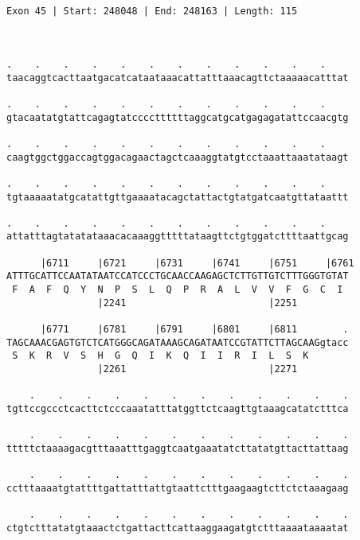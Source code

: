 \documentclass{article}
\begin{document}
\begin{Verbatim}
  
 
Exon 45 | Start: 248048 | End: 248163 | Length: 115



.    .    .    .    .    .    .    .    .    .    .    .    
taacaggtcacttaatgacatcataataaacattatttaaacagttctaaaaacatttat
                                                            
.    .    .    .    .    .    .    .    .    .    .    .    
gtacaatatgtattcagagtatccccttttttaggcatgcatgagagatattccaacgtg
                                                            
.    .    .    .    .    .    .    .    .    .    .    .    
caagtggctggaccagtggacagaactagctcaaaggtatgtcctaaattaaatataagt
                                                            
.    .    .    .    .    .    .    .    .    .    .    .    
tgtaaaaatatgcatattgttgaaaatacagctattactgtatgatcaatgttataattt
                                                            
.    .    .    .    .    .    .    .    .    .    .    .    
attatttagtatatataaacacaaaggtttttataagttctgtggatcttttaattgcag
                                                            
      |6711     |6721     |6731     |6741     |6751     |6761
ATTTGCATTCCAATATAATCCATCCCTGCAACCAAGAGCTCTTGTTGTCTTTGGGTGTAT
 F  A  F  Q  Y  N  P  S  L  Q  P  R  A  L  V  V  F  G  C  I 
                |2241                         |2251         
  
      |6771     |6781     |6791     |6801     |6811        .
TAGCAAACGAGTGTCTCATGGGCAGATAAAGCAGATAATCCGTATTCTTAGCAAGgtacc
 S  K  R  V  S  H  G  Q  I  K  Q  I  I  R  I  L  S  K       
                |2261                         |2271         
  
    .    .    .    .    .    .    .    .    .    .    .    .
tgttccgccctcacttctcccaaatatttatggttctcaagttgtaaagcatatctttca
                                                            
    .    .    .    .    .    .    .    .    .    .    .    .
tttttctaaaagacgtttaaatttgaggtcaatgaaatatcttatatgttacttattaag
                                                            
    .    .    .    .    .    .    .    .    .    .    .    .
cctttaaaatgtattttgattatttattgtaattctttgaagaagtcttctctaaagaag
                                                            
    .    .    .    .    .    .    .    .    .    .    .    .
ctgtctttatatgtaaactctgattacttcattaaggaagatgtctttaaaataaaatat
                                                            

\end{Verbatim}
\end{document}
